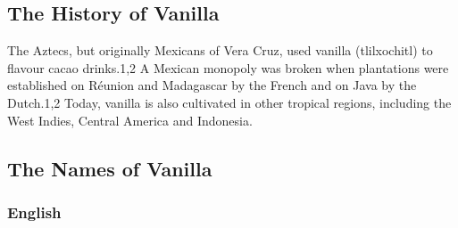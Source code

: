 \subsection{The History of Vanilla}

The Aztecs, but originally Mexicans of Vera Cruz, used vanilla (tlilxochitl) to flavour cacao drinks.1,2 A Mexican monopoly was broken when plantations were established on Réunion and Madagascar by the French and on Java by the Dutch.1,2 Today, vanilla is also cultivated in other tropical regions, including the West Indies, Central America and Indonesia. 












\subsection{The Names of Vanilla}
\label{sec:names_of_vanilla}

\subsubsection{English}



